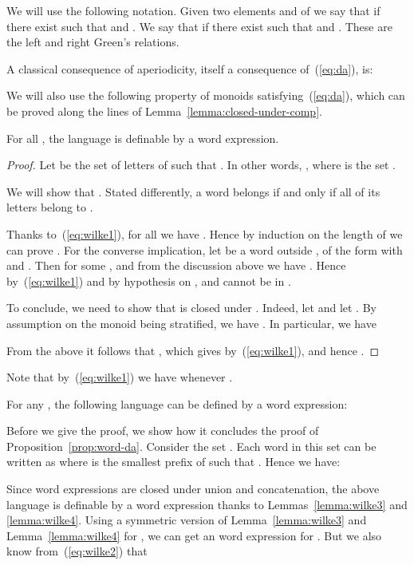 \documentclass{LMCS}
\begin{document}
We will use the following notation. Given two elements  and  of  we
say that  if there exist  such that  and . We
say that  if there exist  such that 
and . These are the left and right Green's relations.

A classical consequence of aperiodicity, itself a consequence
of~(\ref{eq:da}), is:


  We will also use the following property of monoids
  satisfying~(\ref{eq:da}), which can be proved along the lines of
  Lemma~\ref{lemma:closed-under-comp}.



\begin{lem}\label{lemma:wilke3}
  For all , the language  is
  definable by a  word expression. 
\end{lem}
\begin{proof}
  Let  be the set of letters  of  such that . In other words, , where  is the set
  .

  We will show that . Stated differently, a word belongs  if
  and only if all of its letters belong to .


  Thanks to~(\ref{eq:wilke1}), for all  we have . Hence by induction on the length of  we can prove
  . For the converse implication, let  be a word outside ,
  of the form  with  and . Then
 for some , and from the discussion above we
have . Hence by~(\ref{eq:wilke1}) and by hypothesis on ,  and  cannot be in .

  

 To conclude, we need to show that  is closed under .
 Indeed, let  and let . By assumption on the
 monoid being stratified, we have . In
 particular, we have 
 
 From the above it follows that , which gives
  by~(\ref{eq:wilke1}), and hence .
\end{proof}

Note that by~(\ref{eq:wilke1}) we have  whenever .

\begin{lem}\label{lemma:wilke4}
  For any , the following language can be defined by a
   word expression:

\end{lem}


Before we give the proof, we show how it concludes the proof of
Proposition~\ref{prop:word-da}. Consider the set  . Each word  in this set can be written as  where  is the
smallest prefix of  such that . Hence we have:

Since  word expressions are closed under union and concatenation, the
above language is definable by a  word expression  thanks to
Lemmas~\ref{lemma:wilke3} and \ref{lemma:wilke4}.  Using a symmetric version of
Lemma~\ref{lemma:wilke3} and Lemma~\ref{lemma:wilke4} for , we can get
an  word expression for . But we also know
from~(\ref{eq:wilke2}) that
\end{document}
